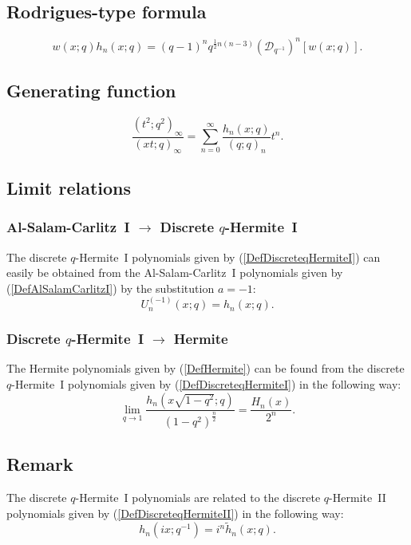 \documentclass[envcountchap,graybox]{svmono}
\newcounter{rom}
\begin{document}
\subsection*{Rodrigues-type formula}
\begin{equation}
\label{RodDiscreteqHermiteI}
w(x;q)h_n(x;q)=(q-1)^nq^{\frac{1}{2}n(n-3)}
\left(\mathcal{D}_{q^{-1}}\right)^n\left[w(x;q)\right].
\end{equation}

\subsection*{Generating function}
\begin{equation}
\label{GenDiscreteqHermiteI}
\frac{(t^2;q^2)_{\infty}}{(xt;q)_{\infty}}=
\sum_{n=0}^{\infty}\frac{h_n(x;q)}{(q;q)_n}t^n.
\end{equation}

\subsection*{Limit relations}

\subsubsection*{Al-Salam-Carlitz~I $\rightarrow$ Discrete $q$-Hermite~I}
The discrete $q$-Hermite~I polynomials given by
(\ref{DefDiscreteqHermiteI}) can easily be obtained from the
Al-Salam-Carlitz~I polynomials given by (\ref{DefAlSalamCarlitzI}) by the
substitution $a=-1$:
$$U_n^{(-1)}(x;q)=h_n(x;q).$$

\subsubsection*{Discrete $q$-Hermite~I $\rightarrow$ Hermite}
The Hermite polynomials given by (\ref{DefHermite}) can be found
from the discrete $q$-Hermite~I polynomials given by
(\ref{DefDiscreteqHermiteI}) in the following way:
\begin{equation}
\lim_{q\rightarrow 1}\frac{h_n(x\sqrt{1-q^2};q)}
{(1-q^2)^{\frac{n}{2}}}=\frac{H_n(x)}{2^n}.
\end{equation}

\subsection*{Remark} The discrete $q$-Hermite~I polynomials are related to the
discrete $q$-Hermite~II polynomials given by (\ref{DefDiscreteqHermiteII})
in the following way:
$$h_n(ix;q^{-1})=i^n{\tilde h}_n(x;q).$$
\end{document}
